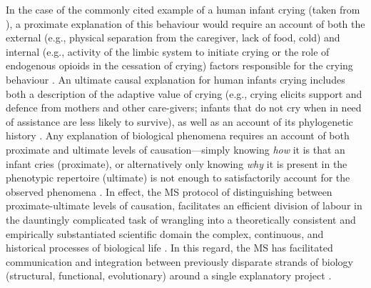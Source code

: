 In the case of the commonly cited example of a human infant crying (taken from \citep{Scott-Phillips2011,Nettle2009,Zeifman2001}), a proximate explanation of this behaviour would require an account of both the external (e.g., physical separation from the caregiver, lack of food, cold) and internal (e.g., activity of the limbic system to initiate crying or the role of endogenous opioids in the cessation of crying) factors responsible for the crying behaviour \citep[38]{Scott-Phillips2011}. An ultimate causal explanation for human infants crying includes both a description of the adaptive value of crying (e.g., crying elicits support and defence from mothers and other care-givers; infants that do not cry when in need of assistance are less likely to survive), as well as an account of its phylogenetic history \citep{Mayr1961,Tinbergen1963}.  Any explanation of biological phenomena requires an account of both proximate and ultimate levels of causation---simply knowing \textit{how} it is that an infant cries (proximate), or alternatively only knowing \textit{why} it is present in the phenotypic repertoire (ultimate) is not enough to satisfactorily account for the observed phenomena \citep[38]{Scott-Phillips2011}.  In effect, the MS protocol of distinguishing between proximate-ultimate levels of causation, facilitates an efficient division of labour in the dauntingly complicated task of wrangling into a theoretically consistent and empirically substantiated scientific domain the complex, continuous, and historical processes of biological life \citep{Mayr1961}. In this regard, the MS has facilitated communication and integration between previously disparate strands of biology (structural, functional, evolutionary) around a single explanatory project \citep{Svensson2017}.

